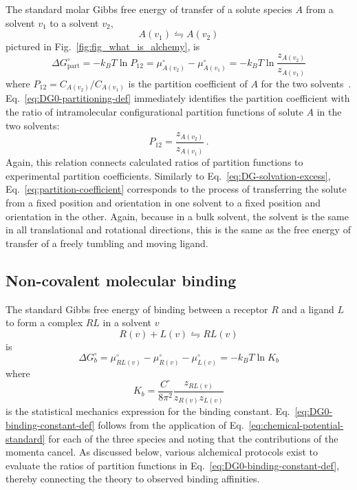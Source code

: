 \documentclass[9pt,bestpractices]{livecoms}
\begin{document}
The standard molar Gibbs free energy of transfer of a solute species $A$ from a  solvent $v_1$ to a solvent $v_2$, 
\begin{equation}
A(v_1)  \leftrightharpoons A(v_2)
\end{equation}
pictured in Fig.~\ref{fig:fig_what_is_alchemy}, is
\begin{equation}
  \Delta G^\circ_{\mathrm{part}} = -k_B T \ln P_{12} = \mu^\circ_{A(v_2)}  - \mu^\circ_{A(v_1)} = -k_B T \ln \frac{z_{A(v_2)}}{z_{A(v_1)}}
  \label{eq:DG0-partitioning-def}
\end{equation}
where $P_{12} = C_{A(v_2)}/C_{A(v_1)}$ is the partition coefficient of $A$ for the two solvents~\cite{rustenburg2016measuring}. Eq.~\ref{eq:DG0-partitioning-def} 
immediately identifies the partition coefficient with the ratio of intramolecular configurational partition functions of solute $A$ in the two solvents:
\begin{equation}
  P_{12} = \frac{z_{A(v_2)}}{z_{A(v_1)}} \, .
  \label{eq:partition-coefficient}
\end{equation}
Again, this relation connects calculated ratios of partition functions to experimental partition coefficients. Similarly to Eq.~\ref{eq:DG-solvation-excess}, Eq.~\ref{eq:partition-coefficient} corresponds to the process of transferring the solute from a fixed position and orientation in one solvent to a fixed position and orientation in the other. Again, because in a bulk solvent, the solvent is the same in all translational and rotational directions, this is the same as the free energy of transfer of a freely tumbling and moving ligand.

\subsection{Non-covalent molecular binding}
\label{sec:non-covalent-molecular-binding}

The standard Gibbs free energy of binding between a receptor $R$ and a ligand $L$ to form a complex $RL$ in a solvent $v$
\begin{equation}
  R(v) + L(v)  \leftrightharpoons RL(v)
  \label{eq:binding-reaction}
\end{equation}
is
\begin{equation}
  \Delta G^\circ_{b} = \mu^\circ_{RL(v)}  - \mu^\circ_{R(v)} - \mu^\circ_{L(v)} = -k_B T \ln K_b 
  \label{eq:DG0-binding-def}
\end{equation}
where~\cite{gilson1997statisticalthermodynamic,gilson2007calculation}
\begin{equation}
  K_b = \frac{C^\circ}{8 \pi^2} \frac{z_{RL(v)}}{z_{R(v)} z_{L(v)}}
  \label{eq:DG0-binding-constant-def}
\end{equation}
is the statistical mechanics expression for the binding constant. Eq.~\ref{eq:DG0-binding-constant-def} follows from the application of  Eq.~\ref{eq:chemical-potential-standard} for each of the three species and noting that the contributions of the momenta cancel. As discussed below, various alchemical protocols exist to evaluate the ratios of partition functions in Eq.~\ref{eq:DG0-binding-constant-def}, thereby connecting the theory to observed binding affinities.
\end{document}
